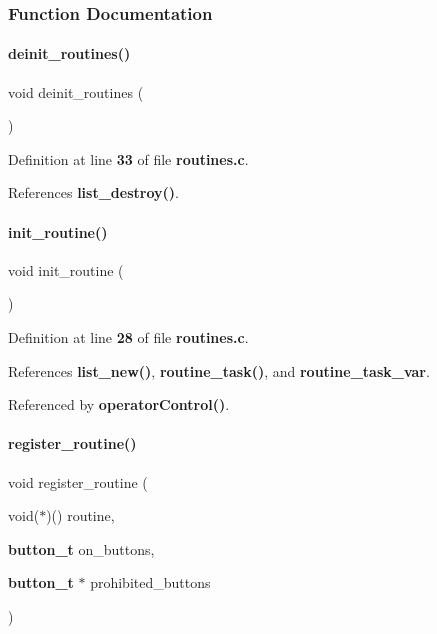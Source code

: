\subsubsection{Function Documentation}
\mbox{\label{routines_8h_ad908adbc884189372f72f882ec62d71d}} 
\paragraph{deinit\+\_\+routines()}
{\footnotesize\ttfamily void deinit\+\_\+routines (\begin{DoxyParamCaption}{ }\end{DoxyParamCaption})}



Definition at line \textbf{ 33} of file \textbf{ routines.\+c}.



References \textbf{ list\+\_\+destroy()}.

\mbox{\label{routines_8h_ab873e24fcc59a2bf7844618b664a5d26}} 
\paragraph{init\+\_\+routine()}
{\footnotesize\ttfamily void init\+\_\+routine (\begin{DoxyParamCaption}{ }\end{DoxyParamCaption})}



Definition at line \textbf{ 28} of file \textbf{ routines.\+c}.



References \textbf{ list\+\_\+new()}, \textbf{ routine\+\_\+task()}, and \textbf{ routine\+\_\+task\+\_\+var}.



Referenced by \textbf{ operator\+Control()}.

\mbox{\label{routines_8h_a4bf3e235fcde5f0e1ce1f693cbb9c01c}} 
\paragraph{register\+\_\+routine()}
{\footnotesize\ttfamily void register\+\_\+routine (\begin{DoxyParamCaption}\item[{void($\ast$)()}]{routine,  }\item[{\textbf{ button\+\_\+t}}]{on\+\_\+buttons,  }\item[{\textbf{ button\+\_\+t} $\ast$}]{prohibited\+\_\+buttons }\end{DoxyParamCaption})}



